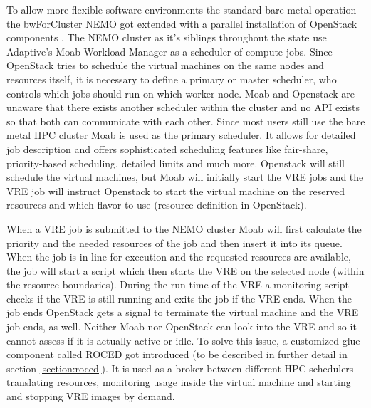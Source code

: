To allow more flexible software environments the standard bare metal operation
the bwForCluster NEMO got extended with a parallel installation of OpenStack
components \cite{hpc-symp:2016}.
The NEMO cluster as it's siblings throughout the state use Adaptive's Moab Workload Manager as a
scheduler of compute jobs.
Since OpenStack tries to schedule the virtual machines on the same nodes and
resources itself, it is necessary to define a primary or master scheduler, who
controls which jobs should run on which worker node. Moab and Openstack are
unaware that there exists another scheduler within the cluster and no API exists
so that both can communicate with each other. Since most users still use the
bare metal HPC cluster Moab is used as the primary scheduler. It allows for
detailed job description and offers sophisticated scheduling features like
fair-share, priority-based scheduling, detailed limits and much more. Openstack
will still schedule the virtual machines, but Moab will initially start the VRE
jobs and the VRE job will instruct Openstack to start the virtual machine on the
reserved resources and which flavor to use (resource definition in OpenStack).

When a VRE job is submitted to the NEMO cluster Moab will first calculate the
priority and the needed resources of the job and then insert it into its queue.
When the job is in line for execution and the requested resources are available,
the job will start a script which then starts the VRE on the selected node
(within the resource boundaries). During the run-time of the VRE a monitoring
script checks if the VRE is still running and exits the job if the VRE ends.
When the job ends OpenStack gets a signal to terminate the virtual machine and
the VRE job ends, as well.  Neither Moab nor OpenStack can look into the VRE and
so it cannot assess if it is actually active or idle. To solve this issue, a
customized glue component called ROCED got introduced (to be described in
further detail in section \ref{section:roced}).  It is used as a broker between
different HPC schedulers translating resources, monitoring usage inside the
virtual machine and starting and stopping VRE images by demand.
